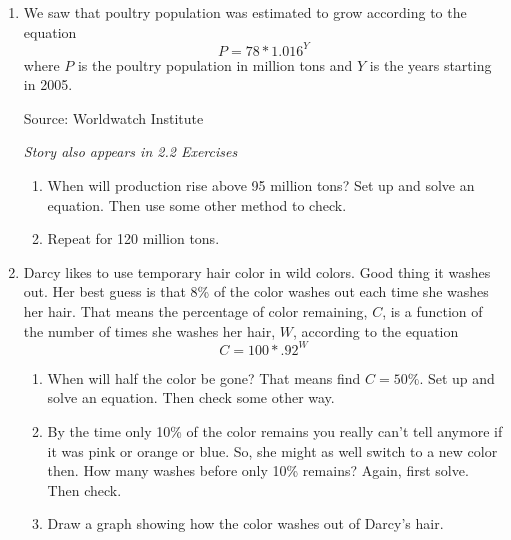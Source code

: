\begin{enumerate}
\item We saw that poultry population was estimated to grow according to the equation $$P = 78 \ast 1.016^Y$$ where $P$ is the poultry population in million tons and $Y$ is the years starting in 2005.
\hfill \begin{footnotesize} Source:  Worldwatch Institute \end{footnotesize} 
\hfill \emph{Story also appears in 2.2 Exercises}
\begin{enumerate}
\item When will production rise above 95 million tons?  Set up and solve an equation.  Then use some other method to check.
\item Repeat for 120 million tons.
\end{enumerate}

\item Darcy likes to use temporary hair color in wild colors.  Good thing it washes out.  Her best guess is that 8\% of the color washes out each time she washes her hair.  That means the percentage of color remaining, $C$, is a function of the number of times she washes her hair, $W$, according to the equation $$C=100 \ast .92^W$$
\begin{enumerate}
\item When will half the color be gone?  That means find $C=50\%$.  Set up and solve an equation.  Then check some other way.
\item By the time only 10\% of the color remains you really can't tell anymore if it was pink or orange or blue.  So, she might as well switch to a new color then.  How many washes before only 10\% remains?  Again, first solve.  Then check.
\item Draw a graph showing how the color washes out of Darcy's hair.
\end{enumerate}

\end{enumerate}


